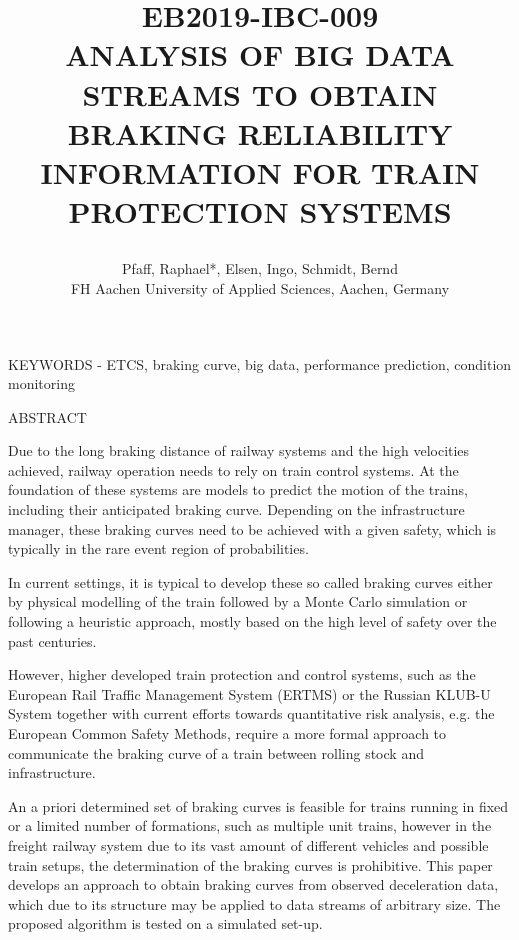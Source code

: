 \documentclass[a4paper, 12pt]{scrartcl}
\begin{document}
\setlength{\parindent}{0ex}
\title{\vspace{-2cm}
	\begin{flushleft}
	{\normalsize\textbf{EB2019-IBC-009}
	}\\ \vspace{.5cm}
	\large \uppercase{Analysis of Big Data Streams to obtain Braking Reliability Information for Train Protection systems}
	\end{flushleft}
	}

\author{\normalsize	
	Pfaff, Raphael*, Elsen, Ingo, Schmidt, Bernd \\ \normalsize	
	FH Aachen University of Applied Sciences, Aachen, Germany %
	}
\date{}
\maketitle


KEYWORDS - ETCS, braking curve, big data, performance prediction, condition monitoring
\vspace{.2cm}

ABSTRACT 

Due to the long braking distance of railway systems and the high velocities achieved, railway operation needs to rely on train control systems. At the foundation of these systems are models to predict the motion of the trains, including their anticipated braking curve. Depending on the infrastructure manager, these braking curves need to be achieved with a given safety, which is typically in the rare event region of probabilities.

In current settings, it is typical to develop these so called braking curves either by physical modelling of the train followed by a Monte Carlo simulation or following a heuristic approach, mostly based on the high level of safety over the past centuries.

However, higher developed train protection and control systems, such as the European Rail Traffic Management System (ERTMS) or the Russian KLUB-U System together with current efforts towards quantitative risk analysis, e.g. the European Common Safety Methods, require a more formal approach to communicate the braking curve of a train between rolling stock and infrastructure.

An a priori determined set of braking curves is feasible for trains running in fixed or a limited number of formations, such as multiple unit trains, however in the freight railway system due to its vast amount of different vehicles and possible train setups, the determination of the braking curves is prohibitive. This paper develops an approach to obtain braking curves from observed deceleration data, which due to its structure may be applied to data streams of arbitrary size. The proposed algorithm is tested on a simulated set-up.
\end{document}
